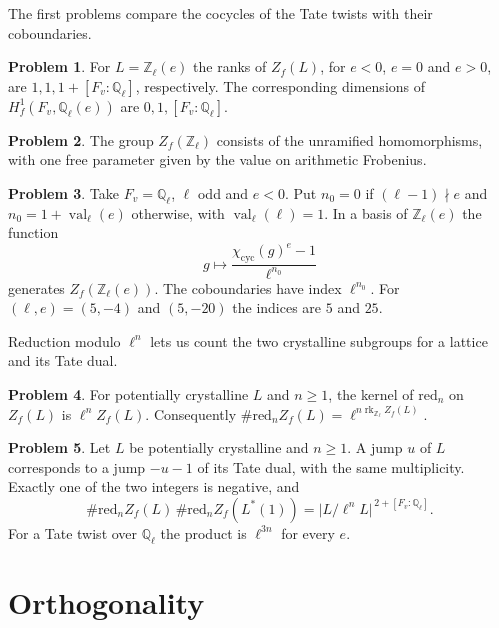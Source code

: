 \documentclass[reqno]{amsart}
\theoremstyle{definition}
\newtheorem{problem}{Problem}[section]
\theoremstyle{plain}
\theoremstyle{remark}
\newcommand{\Z}{\mathbb Z}
\newcommand{\Q}{\mathbb Q}
\newcommand{\rk}{\operatorname{rk}}
\newcommand{\val}{\operatorname{val}}
\begin{document}
The first problems compare the cocycles of the Tate twists with their coboundaries.

\begin{problem}\label{pr:tate-ranks}
For \(L=\Z_\ell(e)\) the ranks of \(Z_f(L)\), for \(e<0\), \(e=0\) and
\(e>0\), are \(1,1,1+[F_v:\Q_\ell]\), respectively. The corresponding
dimensions of \(H^1_f(F_v,\Q_\ell(e))\) are \(0,1,[F_v:\Q_\ell]\).
\end{problem}

\begin{problem}\label{pr:unramified}
The group \(Z_f(\Z_\ell)\) consists of the unramified homomorphisms,
with one free parameter given by the value on arithmetic Frobenius.
\end{problem}

\begin{problem}\label{pr:negative}
Take \(F_v=\Q_\ell\), \(\ell\) odd and \(e<0\). Put \(n_0=0\) if
\((\ell-1)\nmid e\) and \(n_0=1+\val_\ell(e)\) otherwise, with
\(\val_\ell(\ell)=1\). In a basis of \(\Z_\ell(e)\) the function
\[
  g\longmapsto \frac{\chi_{\mathrm{cyc}}(g)^e-1}{\ell^{n_0}}
\]
generates \(Z_f(\Z_\ell(e))\). The coboundaries have index \(\ell^{n_0}\).
For \((\ell,e)=(5,-4)\) and \((5,-20)\) the indices are \(5\) and \(25\).
\end{problem}

Reduction modulo \(\ell^n\) lets us count the two crystalline subgroups for a
lattice and its Tate dual.

\begin{problem}\label{pr:reduction}
For potentially crystalline \(L\) and \(n\ge 1\), the kernel of
\(\mathrm{red}_n\) on \(Z_f(L)\) is \(\ell^n Z_f(L)\).
Consequently \(\#\mathrm{red}_n Z_f(L)=\ell^{n\rk_{\Z_\ell} Z_f(L)}\).
\end{problem}

\begin{problem}\label{pr:dual-jump}
Let \(L\) be potentially crystalline and \(n\ge 1\). A jump \(u\) of
\(L\) corresponds to a jump \(-u-1\) of its Tate dual, with the same
multiplicity. Exactly one of the two integers is negative, and
\[
  \#\mathrm{red}_n Z_f(L)\,\#\mathrm{red}_n Z_f(L^*(1))
  =\lvert L/\ell^nL\rvert^{\,2+[F_v:\Q_\ell]} .
\]
For a Tate twist over \(\Q_\ell\) the product is \(\ell^{3n}\) for every \(e\).
\end{problem}

\section{Orthogonality}\label{sec:duality}
\end{document}
